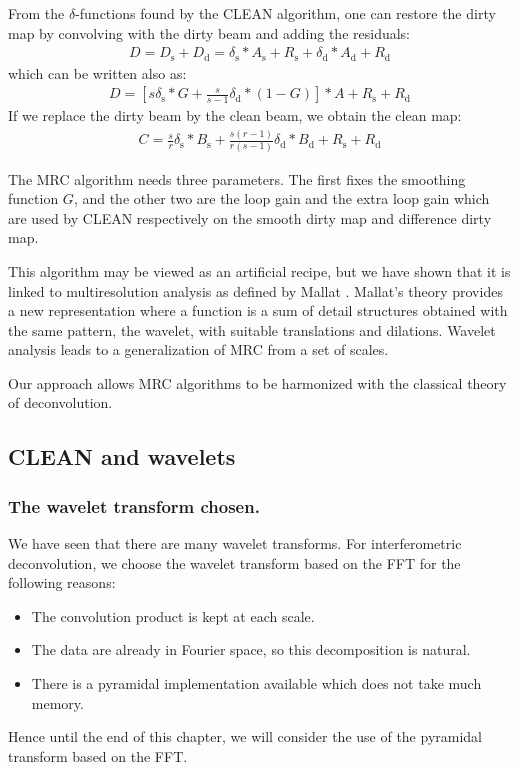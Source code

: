 From the $\delta$-functions found by the CLEAN algorithm, one can restore
the dirty map by convolving with the dirty beam and adding the residuals:
\begin{eqnarray}
D = D_{\mbox{s}} + D_{\mbox{d}} = \delta_{\mbox{s}}*A_{\mbox{s}}+R_{\mbox{s}} 
+ \delta_{\mbox{d}}*A_{\mbox{d}}+R_{\mbox{d}}
\end{eqnarray}
which can be written also as:
\begin{eqnarray}
D = \left[ s\delta_{\mbox{s}}*G + \frac{s}{s-1}\delta_{\mbox{d}}*(1-G) \right]*A+ 
R_{\mbox{s}}+R_{\mbox{d}}
\end{eqnarray}
If we replace the dirty beam by the clean beam, we obtain the clean map:
\begin{eqnarray}
C = \frac{s}{r}\delta_{\mbox{s}} * B_{\mbox{s}} + \frac{s(r-1)}{r(s-1)}
\delta_{\mbox{d}}
* B_{\mbox{d}}+R_{\mbox{s}}+R_{\mbox{d}}
\end{eqnarray}

The MRC algorithm  needs three parameters.
The first fixes the smoothing function  $G$, and the other two are the 
 loop gain and the  extra loop gain which are used by  CLEAN respectively
on the smooth dirty map and  difference dirty map.

This algorithm may be viewed as an artificial recipe, but we have
shown \cite{starck:sta94_1} that it is linked to 
multiresolution analysis as defined by Mallat \cite{wave:mallat89}. 
Mallat's theory provides a new representation where a
function is a sum of detail structures obtained with the same pattern, the
wavelet, with suitable translations and dilations. Wavelet analysis
leads to a generalization of MRC from a set of scales.

Our approach allows MRC algorithms to be harmonized with the
classical theory of deconvolution.
 
\subsection{CLEAN and wavelets}
\subsubsection{The wavelet transform chosen.}
We have seen that there are many wavelet transforms. For interferometric
deconvolution, we choose the wavelet transform based on the FFT for
the following reasons:
\begin{itemize}
\item The convolution product is kept at each scale.
\item The data are already in Fourier space, so this decomposition
is natural.
\item There is a pyramidal implementation available which does not take 
much memory.
\end{itemize}
Hence until the end of this chapter, we will consider the use of the
pyramidal transform based on the FFT.

